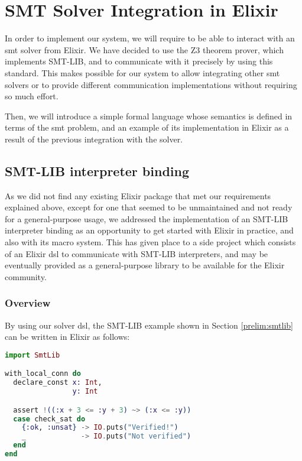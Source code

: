 \chapter{SMT Solver Integration in Elixir}
\label{cap:smtSolverIntegration}

In order to implement our system, we will require to be able to interact with an
\acrshort{smt} solver from Elixir. We have decided to use the Z3 theorem prover,
which implements SMT-LIB, and to communicate with it precisely by using this
standard. This makes possible for our system to allow integrating other 
\acrshort{smt} solvers or to provide different communication implementations
without requiring so much effort.

Then, we will introduce a simple formal language whose semantics is defined in
terms of the \gls{smt} problem, and an example of its implementation in Elixir
as a result of the previous integration with the solver.

\section{SMT-LIB interpreter binding}

As we did not find any existing Elixir package that met our requirements
explained above, except for one that seemed to be unmaintained and not ready for
a general-purpose usage, we addressed the implementation of an SMT-LIB
interpreter binding as an opportunity to get started with Elixir in practice,
and also with its macro system. This has given place to a side project which
consists of an Elixir \gls{dsl} to communicate with SMT-LIB interpreters, and
may be eventually provided as a general-purpose library to be available for the
Elixir community.

\subsection{Overview}
\label{integ:dslexample}

By using our solver \gls{dsl}, the SMT-LIB example shown in Section
\ref{prelim:smtlib} can be written in Elixir as follows:

\begin{lstlisting}[language=elixir,numbers=none,frame=none]
import SmtLib

with_local_conn do
  declare_const x: Int,
                y: Int

  assert !((:x + 3 <= :y + 3) ~> (:x <= :y))
  case check_sat do 
    {:ok, :unsat} -> IO.puts("Verified!")
    _             -> IO.puts("Not verified")
  end
end
\end{lstlisting}

